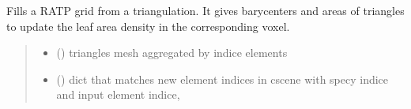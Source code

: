 \documentclass[letterpaper,10pt,english]{sphinxmanual}
\begin{document}

\begin{fulllineitems}
\label{\detokenize{reference:voxelsmesh.fill_ratpgrid_from_trimesh}}
\pysigstartsignatures
{}
\pysigstopsignatures
\sphinxAtStartPar
Fills a RATP grid from a triangulation.
It gives barycenters and areas of triangles to update the leaf area density in the corresponding
voxel.
\begin{quote}\begin{description}
\begin{itemize}
\item {} 
\sphinxAtStartPar
{} () \textendash{} 
\sphinxAtStartPar
triangles mesh aggregated by indice elements

\begin{sphinxVerbatim}[commandchars=\\\{\}]
   \PYG{p}{[}  \PYG{p}{]}
\end{sphinxVerbatim}


\item {} 
\sphinxAtStartPar
{} () \textendash{} 
\sphinxAtStartPar
dict that matches new element indices in cscene with specy indice and
input element indice,

\begin{sphinxVerbatim}[commandchars=\\\{\}]
      
\end{sphinxVerbatim}


\end{itemize}
\end{description}
\end{quote}
\end{fulllineitems}
\end{document}
